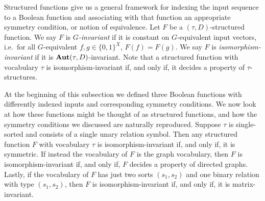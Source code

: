 \documentclass[../paper.tex]{subfiles}
\begin{document}

Structured functions give us a general framework for indexing the input sequence
to a Boolean function and associating with that function an appropriate symmetry
condition, or notion of equivalence. Let $F$ be a $(\tau, D)$-structured
function. We say $F$ is \emph{$G$-invariant} if it is constant on $G$-equivalent
input vectors, i.e.\ for all $G$-equivalent $f, g \in \{0,1\}^{X}$, $F(f) =
F(g)$. We say $F$ is \emph{isomorphism-invariant} if it is $\text{\textbf{Aut}}(\tau,
D)$-invariant. Note that a structured function with vocabulary $\tau$ is
isomorphism-invariant if, and only if, it decides a property of
$\tau$-structures.

At the beginning of this subsection we defined three Boolean functions with
differently indexed inputs and corresponding symmetry conditions. We now look at
how these functions might be thought of as structured functions, and how the
symmetry conditions we discussed are naturally reproduced. Suppose $\tau$ is
single-sorted and consists of a single unary relation symbol. Then any
structured function $F$ with vocabulary $\tau$ is isomorphism-invariant if, and
only if, it is symmetric. If instead the vocabulary of $F$ is the graph
vocabulary, then $F$ is isomorphism-invariant if, and only if, $F$ decides a
property of directed graphs. Lastly, if the vocabulary of $F$ has just two sorts
$(s_1, s_2)$ and one binary relation with type $(s_1, s_2)$, then $F$ is
isomorphism-invariant if, and only if, it is matrix-invariant.
\end{document}
